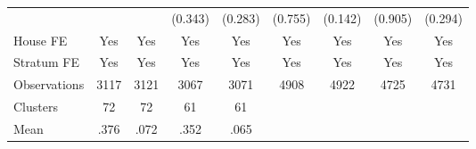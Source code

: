 {\begin{tabular}{l*{8}{c}}
                &                  &                  &  (0.343)         &  (0.283)         &  (0.755)         &  (0.142)         &  (0.905)         &  (0.294)         \\
House FE        &      Yes         &      Yes         &      Yes         &      Yes         &      Yes         &      Yes         &      Yes         &      Yes         \\
Stratum FE      &      Yes         &      Yes         &      Yes         &      Yes         &      Yes         &      Yes         &      Yes         &      Yes         \\
\midrule
Observations    &     3117         &     3121         &     3067         &     3071         &     4908         &     4922         &     4725         &     4731         \\
Clusters        &       72         &       72         &       61         &       61         &                  &                  &                  &                  \\
Mean            &     .376         &     .072         &     .352         &     .065         &                  &                  &                  &                  \\
\bottomrule
\end{tabular}
}
